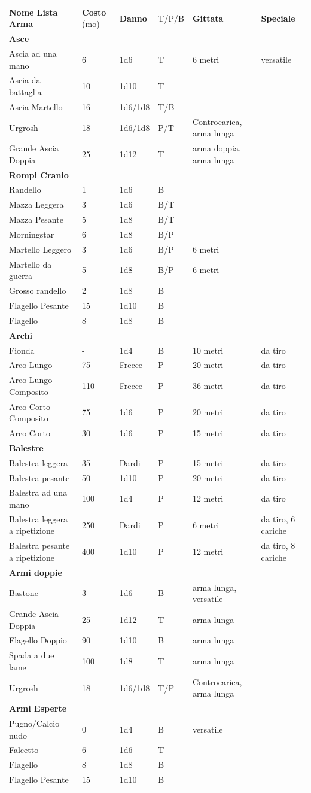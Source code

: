 \documentclass[a4paper,11pt,twoside,openany]{book}
\begin{document}
{\bigskip
\begin{longtable}{|L{3.5cm} |k{1,3cm} |k{1.5cm}| k{1.3cm} |L{4.5cm} |k{3cm}|}
	\textbf{Nome Lista Arma} & \textbf{Costo} (mo) & \textbf{Danno} & T/P/B & \textbf{Gittata} & \textbf{Speciale}\tabularnewline
	\textbf{Asce} & & & & & \tabularnewline
	Ascia ad una mano & 6 & 1d6 & T & 6 metri & versatile\tabularnewline
	Ascia da battaglia & 10 & 1d10 & T & - & -\tabularnewline
	Ascia Martello & 16 & 1d6/1d8 & T/B & & \tabularnewline
	Urgrosh & 18 & 1d6/1d8 & P/T & Controcarica, arma lunga & \tabularnewline
	Grande Ascia Doppia & 25 & 1d12 & T & arma doppia, arma lunga & \tabularnewline
	\textbf{Rompi Cranio} & & & & & \tabularnewline
	Randello & 1 & 1d6 & B & & \tabularnewline
	Mazza Leggera & 3 & 1d6 & B/T & & \tabularnewline
	Mazza Pesante & 5 & 1d8 & B/T & & \tabularnewline
	Morningstar & 6 & 1d8 & B/P & & \tabularnewline
	Martello Leggero & 3 & 1d6 & B/P & 6 metri & \tabularnewline
	Martello da guerra & 5 & 1d8 & B/P & 6 metri & \tabularnewline
	Grosso randello & 2 & 1d8 & B & & \tabularnewline
	Flagello Pesante & 15 & 1d10 & B & & \tabularnewline
	Flagello & 8 & 1d8 & B & & \tabularnewline
	\textbf{Archi} & & & & & \tabularnewline
	Fionda & - & 1d4 & B & 10 metri & da tiro\tabularnewline
	Arco Lungo & 75 & Frecce & P & 20 metri & da tiro\tabularnewline
	Arco Lungo Composito & 110 & Frecce & P & 36 metri & da tiro\tabularnewline
	Arco Corto Composito & 75 & 1d6 & P & 20 metri & da tiro\tabularnewline
	Arco Corto & 30 & 1d6 & P & 15 metri & da tiro\tabularnewline
	\textbf{Balestre} & & & & & \tabularnewline
	Balestra leggera & 35 & Dardi & P & 15 metri & da tiro\tabularnewline
	Balestra pesante & 50 & 1d10 & P & 20 metri & da tiro\tabularnewline
	Balestra ad una mano & 100 & 1d4 & P & 12 metri & da tiro\tabularnewline
	Balestra leggera a ripetizione & 250 & Dardi & P & 6 metri & da tiro, 6 cariche\tabularnewline
	Balestra pesante a ripetizione & 400 & 1d10 & P & 12 metri & da tiro, 8 cariche\tabularnewline
	\textbf{Armi doppie} & & & & & \tabularnewline
	Bastone & 3 & 1d6 & B & arma lunga, versatile & \tabularnewline
	Grande Ascia Doppia & 25 & 1d12 & T & arma lunga & \tabularnewline
	Flagello Doppio & 90 & 1d10 & B & arma lunga & \tabularnewline
	Spada a due lame & 100 & 1d8 & T & arma lunga & \tabularnewline
	Urgrosh & 18 & 1d6/1d8 & T/P & Controcarica, arma lunga & \tabularnewline
	\textbf{Armi Esperte} & & & & & \tabularnewline
	Pugno/Calcio nudo & 0 & 1d4 & B & versatile & \tabularnewline
	Falcetto & 6 & 1d6 & T & & \tabularnewline
	Flagello & 8 & 1d8 & B & & \tabularnewline
	Flagello Pesante & 15 & 1d10 & B & & \tabularnewline

\end{longtable}}
\end{document}

